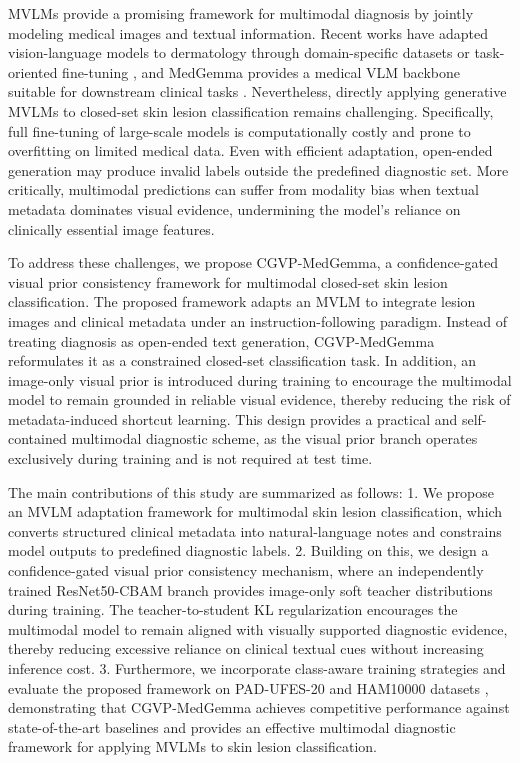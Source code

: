 \documentclass[preprint,12pt]{elsarticle}
\makeatletter
\def@NAT@last@yr{--\NAT@penalty}%
\makeatother
\begin{document}
MVLMs provide a promising framework for multimodal diagnosis by jointly modeling medical images and textual information. Recent works have adapted vision-language models to dermatology through domain-specific datasets or task-oriented fine-tuning \cite{zhu2026concept,zeng2025mmskin}, and MedGemma provides a medical VLM backbone suitable for downstream clinical tasks \cite{sellergren2025medgemma}. Nevertheless, directly applying generative MVLMs to closed-set skin lesion classification remains challenging. Specifically, full fine-tuning of large-scale models is computationally costly and prone to overfitting on limited medical data. Even with efficient adaptation, open-ended generation may produce invalid labels outside the predefined diagnostic set. More critically, multimodal predictions can suffer from modality bias when textual metadata dominates visual evidence, undermining the model's reliance on clinically essential image features.



To address these challenges, we propose CGVP-MedGemma, a confidence-gated visual prior consistency framework for multimodal closed-set skin lesion classification. The proposed framework adapts an MVLM to integrate lesion images and clinical metadata under an instruction-following paradigm. Instead of treating diagnosis as open-ended text generation, CGVP-MedGemma reformulates it as a constrained closed-set classification task. In addition, an image-only visual prior is introduced during training to encourage the multimodal model to remain grounded in reliable visual evidence, thereby reducing the risk of metadata-induced shortcut learning. This design provides a practical and self-contained multimodal diagnostic scheme, as the visual prior branch operates exclusively during training and is not required at test time.

The main contributions of this study are summarized as follows: 1. We propose an MVLM adaptation framework for multimodal skin lesion classification, which converts structured clinical metadata into natural-language notes and constrains model outputs to predefined diagnostic labels. 2. Building on this, we design a confidence-gated visual prior consistency mechanism, where an independently trained ResNet50-CBAM branch provides image-only soft teacher distributions during training. The teacher-to-student KL regularization encourages the multimodal model to remain aligned with visually supported diagnostic evidence, thereby reducing excessive reliance on clinical textual cues without increasing inference cost. 3. Furthermore, we incorporate class-aware training strategies and 
evaluate the proposed framework on PAD-UFES-20 and HAM10000 datasets \cite{tschandl2018ham10000,pacheco2020padufes20}, demonstrating that CGVP-MedGemma achieves competitive performance against state-of-the-art baselines and provides an effective multimodal diagnostic framework for applying MVLMs to skin lesion classification.
\end{document}
